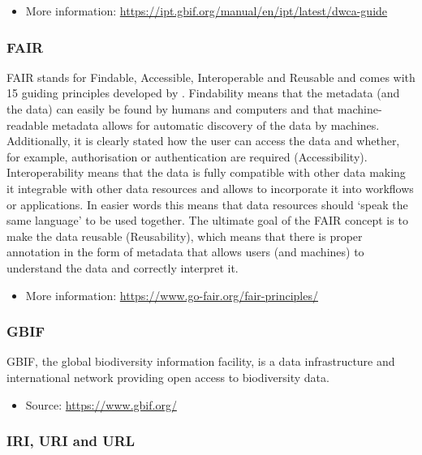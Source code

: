 \documentclass[
  oneside]{book}
\providecommand{\tightlist}{%
  \setlength{\itemsep}{0pt}\setlength{\parskip}{0pt}}
\begin{document}
\begin{itemize}
\tightlist
\item
  More information: \url{https://ipt.gbif.org/manual/en/ipt/latest/dwca-guide}
\end{itemize}

\subsubsection*{FAIR}\label{FAIR}

FAIR stands for Findable, Accessible, Interoperable and Reusable and comes with 15 guiding principles developed by \textcite{Wilkinson_2016}. Findability means that the metadata (and the data) can easily be found by humans and computers and that machine-readable metadata allows for automatic discovery of the data by machines. Additionally, it is clearly stated how the user can access the data and whether, for example, authorisation or authentication are required (Accessibility). Interoperability means that the data is fully compatible with other data making it integrable with other data resources and allows to incorporate it into workflows or applications. In easier words this means that data resources should `speak the same language' to be used together. The ultimate goal of the FAIR concept is to make the data reusable (Reusability), which means that there is proper annotation in the form of metadata that allows users (and machines) to understand the data and correctly interpret it.

\begin{itemize}
\tightlist
\item
  More information: \url{https://www.go-fair.org/fair-principles/}
\end{itemize}

\subsubsection*{GBIF}\label{GBIF}

GBIF, the global biodiversity information facility, is a data infrastructure and international network providing open access to biodiversity data.

\begin{itemize}
\tightlist
\item
  Source: \url{https://www.gbif.org/}
\end{itemize}

\subsubsection*{IRI, URI and URL}\label{URI}
\end{document}

